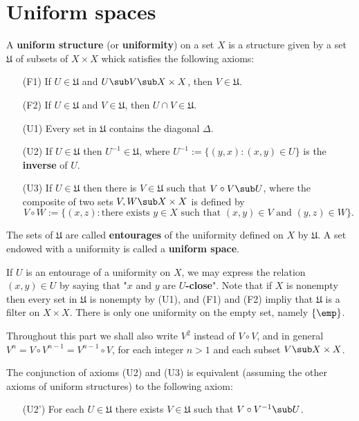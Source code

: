 \section{Uniform spaces}
\begin{definition}
A \textbf{uniform structure} (or \textbf{uniformity}) on a set $X$ is a structure given by a set $\mathfrak{U}$ of subsets of $X\times X$ whick satisfies the following axioms:
\begin{itemize}
\item[(F1)] If $U\in\mathfrak{U}$ and $U\sub V\sub X\times X$, then $V\in\mathfrak{U}$.
\item[(F2)] If $U\in\mathfrak{U}$ and $V\in\mathfrak{U}$, then $U\cap V\in\mathfrak{U}$.
\item[(U1)] Every set in $\mathfrak{U}$ contains the diagonal $\Delta$.
\item[(U2)] If $U\in\mathfrak{U}$ then $U^{-1}\in\mathfrak{U}$, where $U^{-1}:=\{(y,x):(x,y)\in U\}$ is the \textbf{inverse} of $U$. 
\item[(U3)] If $U\in\mathfrak{U}$ then there is $V\in\mathfrak{U}$ such that $V\circ V\sub U$, where the composite of two sets $V,W\sub X\times X$ is defined by
\[V\circ W:=\{(x,z):\text{there exists $y\in X$ such that $(x,y)\in V$ and $(y,z)\in W$}\}.\]
\end{itemize}
The sets of $\mathfrak{U}$ are called \textbf{entourages} of the uniformity defined on $X$ by $\mathfrak{U}$. A set endowed with a uniformity is called a \textbf{uniform space}.
\end{definition}
If $U$ is an entourage of a uniformity on $X$, we may express the relation $(x,y)\in U$ by saying that "$x$ and $y$ are \textbf{$U$-close}". Note that if $X$ is nonempty then every set in $\mathfrak{U}$ is nonempty by (U1), and (F1) and (F2) impliy that $\mathfrak{U}$ is a filter on $X\times X$. There is only one uniformity on the empty set, namely $\{\emp\}$.\par
Throughout this part we shall also write $V^2$ instead of $V\circ V$, and in general $V^n=V\circ V^{n-1}=V^{n-1}\circ V$, for each integer $n>1$ and each subset $V\sub X\times X$. 
\begin{lemma}\label{uniformity equivalent axiom}
The conjunction of axioms (U2) and (U3) is equivalent (assuming the other axioms of uniform structures) to the following axiom:
\begin{itemize}
\item[(U2')] For each $U\in\mathfrak{U}$ there exists $V\in\mathfrak{U}$ such that $V\circ V^{-1}\sub U$.
\end{itemize}
\end{lemma}
